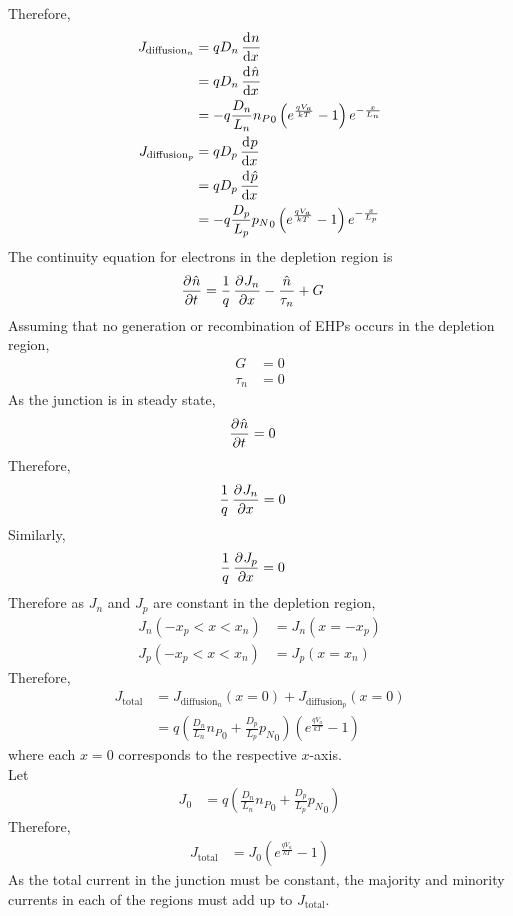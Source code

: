 \documentclass[titlepage, fleqn, a4paper, 12pt, twoside]{article}
\theoremstyle{definition}
\theoremstyle{theorem}
\begin{document}
Therefore,
\begin{align*}
	J_{\text{diffusion}_n} &= q D_n \dod{n}{x}\\
	&= q D_n \dod{\hat{n}}{x}\\
	&= -q \frac{D_n}{L_n} {n_P}_0 \left( e^{\frac{q V_a}{k T}} - 1 \right) e^{-\frac{x}{L_n}}\\
	J_{\text{diffusion}_p} &= q D_p \dod{p}{x}\\
	&= q D_p \dod{\hat{p}}{x}\\
	&= -q \frac{D_p}{L_p} {p_N}_0 \left( e^{\frac{q V_a}{k T}} - 1 \right) e^{-\frac{x}{L_p}}
\end{align*}
The continuity equation for electrons in the depletion region is
\begin{align*}
	\dpd{\hat{n}}{t} &= \frac{1}{q} \dpd{J_n}{x} - \frac{\hat{n}}{\tau_n} + G
\end{align*}
Assuming that no generation or recombination of EHPs occurs in the depletion region,
\begin{align*}
	G &= 0\\
	\tau_n &= 0
\end{align*}
As the junction is in steady state,
\begin{align*}
	\dpd{\hat{n}}{t} &= 0
\end{align*}
Therefore,
\begin{align*}
	\frac{1}{q} \dpd{J_n}{x} &= 0
\end{align*}
Similarly,
\begin{align*}
	\frac{1}{q} \dpd{J_p}{x} &= 0
\end{align*}
Therefore as $J_n$ and $J_p$ are constant in the depletion region,
\begin{align*}
	J_n(-x_p < x < x_n) &= J_n(x = -x_p)\\
	J_p(-x_p < x < x_n) &= J_p(x = x_n)
\end{align*}
Therefore,
\begin{align*}
	J_{\text{total}} &= J_{\text{diffusion}_n}(x = 0) + J_{\text{diffusion}_p}(x = 0)\\
	&= q \left( \frac{D_n}{L_n} {n_P}_0 + \frac{D_p}{L_p} {p_N}_0 \right) \left( e^{\frac{q V_a}{k T}} - 1 \right)
\end{align*}
where each $x = 0$ corresponds to the respective $x$-axis.\\
Let
\begin{align*}
	J_0 &= q \left( \frac{D_n}{L_n} {n_P}_0 + \frac{D_p}{L_p} {p_N}_0 \right)
\end{align*}
Therefore,
\begin{align*}
	J_{\text{total}} &= J_0 \left( e^{\frac{q V_a}{k T}} - 1 \right)
\end{align*}
As the total current in the junction must be constant, the majority and minority currents in each of the regions must add up to $J_{\text{total}}$.
\end{document}
